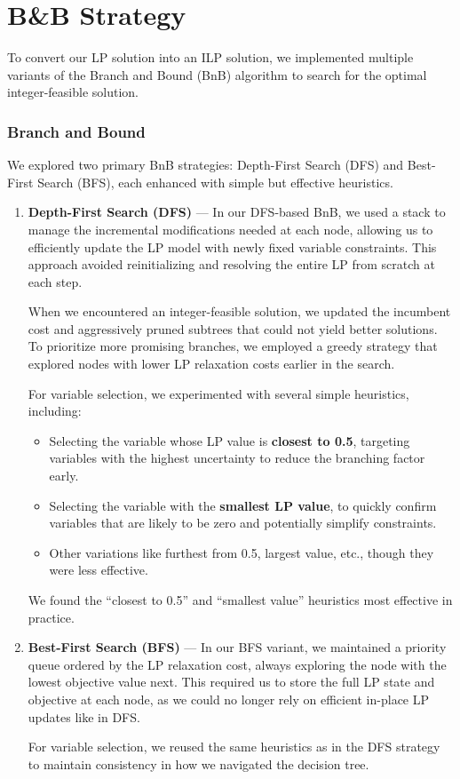 \documentclass[11pt]{article}
\begin{document}
\section*{B\&B Strategy}

To convert our LP solution into an ILP solution, we implemented multiple variants of the Branch and Bound (BnB) algorithm to search for the optimal integer-feasible solution.

\subsubsection*{Branch and Bound}

We explored two primary BnB strategies: Depth-First Search (DFS) and Best-First Search (BFS), each enhanced with simple but effective heuristics.

\begin{enumerate}
    \item \textbf{Depth-First Search (DFS)} —  
    In our DFS-based BnB, we used a stack to manage the incremental modifications needed at each node, allowing us to efficiently update the LP model with newly fixed variable constraints. This approach avoided reinitializing and resolving the entire LP from scratch at each step. 

    When we encountered an integer-feasible solution, we updated the incumbent cost and aggressively pruned subtrees that could not yield better solutions. To prioritize more promising branches, we employed a greedy strategy that explored nodes with lower LP relaxation costs earlier in the search.

    For variable selection, we experimented with several simple heuristics, including:
    \begin{itemize}
        \item Selecting the variable whose LP value is \textbf{closest to 0.5}, targeting variables with the highest uncertainty to reduce the branching factor early.
        \item Selecting the variable with the \textbf{smallest LP value}, to quickly confirm variables that are likely to be zero and potentially simplify constraints.
        \item Other variations like furthest from 0.5, largest value, etc., though they were less effective.
    \end{itemize}
    We found the “closest to 0.5” and “smallest value” heuristics most effective in practice.

    \item \textbf{Best-First Search (BFS)} —  
    In our BFS variant, we maintained a priority queue ordered by the LP relaxation cost, always exploring the node with the lowest objective value next. This required us to store the full LP state and objective at each node, as we could no longer rely on efficient in-place LP updates like in DFS.

    For variable selection, we reused the same heuristics as in the DFS strategy to maintain consistency in how we navigated the decision tree.
\end{enumerate}
\end{document}
